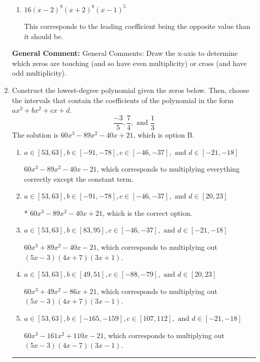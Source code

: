 \documentclass{extbook}[14pt]
\newcommand{\litem}[1]{\item #1

\rule{\textwidth}{0.4pt}}
\begin{document}
\begin{enumerate}
{\begin{enumerate}[label=\Alph*.]
* This is the correct option.
\item \( 16(x - 2)^{8} (x + 2)^{8} (x - 1)^{5} \)

This corresponds to the leading coefficient being the opposite value than it should be.
\end{enumerate}

\textbf{General Comment:} General Comments: Draw the x-axis to determine which zeros are touching (and so have even multiplicity) or cross (and have odd multiplicity).
}
\litem{
Construct the lowest-degree polynomial given the zeros below. Then, choose the intervals that contain the coefficients of the polynomial in the form $ax^3+bx^2+cx+d$.
\[ \frac{-3}{5}, \frac{7}{4}, \text{ and } \frac{1}{3} \]The solution is \( 60x^{3} -89 x^{2} -40 x + 21 \), which is option B.\begin{enumerate}[label=\Alph*.]
\item \( a \in [53, 63], b \in [-91, -78], c \in [-46, -37], \text{ and } d \in [-21, -18] \)

$60x^{3} -89 x^{2} -40 x -21$, which corresponds to multiplying everything correctly except the constant term.
\item \( a \in [53, 63], b \in [-91, -78], c \in [-46, -37], \text{ and } d \in [20, 23] \)

* $60x^{3} -89 x^{2} -40 x + 21$, which is the correct option.
\item \( a \in [53, 63], b \in [83, 95], c \in [-46, -37], \text{ and } d \in [-21, -18] \)

$60x^{3} +89 x^{2} -40 x -21$, which corresponds to multiplying out $(5x -3)(4x + 7)(3x + 1)$.
\item \( a \in [53, 63], b \in [49, 51], c \in [-88, -79], \text{ and } d \in [20, 23] \)

$60x^{3} +49 x^{2} -86 x + 21$, which corresponds to multiplying out $(5x -3)(4x + 7)(3x -1)$.
\item \( a \in [53, 63], b \in [-165, -159], c \in [107, 112], \text{ and } d \in [-21, -18] \)

$60x^{3} -161 x^{2} +110 x -21$, which corresponds to multiplying out $(5x -3)(4x -7)(3x -1)$.
\end{enumerate}

}
\end{enumerate}
\end{document}
